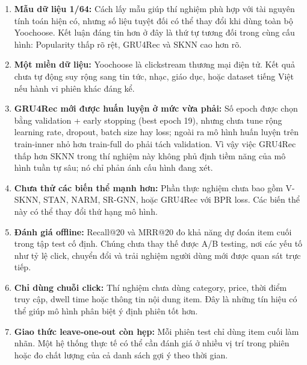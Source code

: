 \documentclass[12pt, a4paper]{article}
\begin{document}
\begin{enumerate}
    \item \textbf{Mẫu dữ liệu 1/64:} Cách lấy mẫu giúp thí nghiệm phù hợp với tài nguyên tính toán hiện có, nhưng số liệu tuyệt đối có thể thay đổi khi dùng toàn bộ Yoochoose. Kết luận đáng tin hơn ở đây là thứ tự tương đối trong cùng cấu hình: Popularity thấp rõ rệt, GRU4Rec và SKNN cao hơn rõ.

    \item \textbf{Một miền dữ liệu:} Yoochoose là clickstream thương mại điện tử. Kết quả chưa tự động suy rộng sang tin tức, nhạc, giáo dục, hoặc dataset tiếng Việt nếu hành vi phiên khác đáng kể.

    \item \textbf{GRU4Rec mới được huấn luyện ở mức vừa phải:} Số epoch được chọn bằng validation + early stopping (best epoch 19), nhưng chưa tune rộng learning rate, dropout, batch size hay loss; ngoài ra mô hình huấn luyện trên train-inner nhỏ hơn train-full do phải tách validation. Vì vậy việc GRU4Rec thấp hơn SKNN trong thí nghiệm này không phủ định tiềm năng của mô hình tuần tự sâu; nó chỉ phản ánh cấu hình đang xét.

    \item \textbf{Chưa thử các biến thể mạnh hơn:} Phần thực nghiệm chưa bao gồm V-SKNN, STAN, NARM, SR-GNN, hoặc GRU4Rec với BPR loss. Các biến thể này có thể thay đổi thứ hạng mô hình.

    \item \textbf{Đánh giá offline:} Recall@20 và MRR@20 đo khả năng dự đoán item cuối trong tập test cố định. Chúng chưa thay thế được A/B testing, nơi các yếu tố như tỷ lệ click, chuyển đổi và trải nghiệm người dùng mới được quan sát trực tiếp.

    \item \textbf{Chỉ dùng chuỗi click:} Thí nghiệm chưa dùng category, price, thời điểm truy cập, dwell time hoặc thông tin nội dung item. Đây là những tín hiệu có thể giúp mô hình phân biệt ý định phiên tốt hơn.

    \item \textbf{Giao thức leave-one-out còn hẹp:} Mỗi phiên test chỉ dùng item cuối làm nhãn. Một hệ thống thực tế có thể cần đánh giá ở nhiều vị trí trong phiên hoặc đo chất lượng của cả danh sách gợi ý theo thời gian.
\end{enumerate}

\newpage


\end{document}

